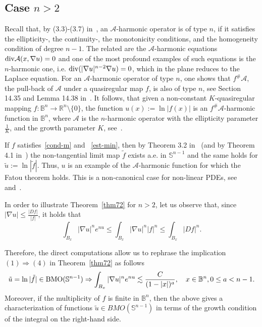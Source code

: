 \documentclass[11pt,a4paper,reqno]{amsart}
\theoremstyle{definition}
\newcommand{\B}{\mathbb{B}^n}
\newcommand{\Rn}{{\mathbb R}^n}
\newcommand{\Sn}{\mathbb{S}^{n-1}}
\newcommand{\A}{\mathcal{A}}
\numberwithin{komcounter}{section}
\begin{document}
\subsection{Case $n>2$} Recall that, by (3.3)-(3.7) in~\cite[Chapter 3]{hkm}, an $\A$-harmonic operator is of type $n$,
if it satisfies the ellipticity-, the continuity-, the monotonicity conditions, and the homogeneity condition of degree $n-1$. The related are the $\A$-harmonic equations ${\rm div} \A(x,\nabla u)=0$ and one of the most profound examples of such equations is the $n$-harmonic one, i.e. ${\rm div} (|\nabla u|^{n-2}\nabla u)=0$, which in the plane reduces to the Laplace equation. For an $\A$-harmonic operator of type $n$, one shows that $f^{\#}\A$, the pull-back of $\A$ under a quasiregular map $f$, is also of type $n$, see Section 14.35 and Lemma 14.38 in~\cite{hkm}. It follows, that given a non-constant $K$-quasiregular mapping $f:\B \to \Rn \setminus\{0\}$, the function $u(x):=\ln|f(x)|$ is an $f^{\#}\A$-harmonic function in $\B$, where $\A$ is the $n$-harmonic operator with the ellipticity parameter $\frac 1K$, and the growth parameter $K$, see~\cite[Lemma 14.19]{hkm}. 

If $f$ satisfies~\eqref{cond-m} and ~\eqref{est-min}, then by Theorem 3.2 in~\cite{ag2} (and by Theorem 4.1 in~\cite{kmv}) the non-tangential limit map $\tilde{f}$ exists a.e. in $\Sn$ and the same holds for $\tilde{u}:=\ln |\tilde{f}|$. Thus, $u$ is an example of the $\A$-harmonic function for which the Fatou theorem holds. This is a non-canonical case for non-linear PDEs, see~\cite{manwe} and~\cite{fabes}.  

In order to illustrate Theorem~\ref{thm72} for $n>2$, let us observe that, since $|\nabla u|\leq \frac{|Df|}{|f|}$, it holds that
\[
\int_{B_x }|\nabla u|^n e^{n u} \leq \int_{B_x }|\nabla u|^n |f|^n\leq \int_{B_x }|Df|^n. 
\]
 
Therefore, the direct computations allow us to rephrase the implication $(1)\Rightarrow (4)$ in Theorem~\ref{thm72} as follows
\[
 \tilde{u}=\ln |\tilde{f}| \in \hbox{BMO}(\Sn) \Rightarrow \int_{B_x }|\nabla u|^n e^{n u} \lesssim \frac{C}{(1-|x|)^a},\quad x\in \B, 0\leq a<n-1.
\]
Moreover, if the multiplicity of $f$ is finite in $\B$, then the above gives a characterization of functions $\tilde{u}\in BMO(\Sn)$ in terms of the growth condition of the integral on the right-hand side.
\end{document}
